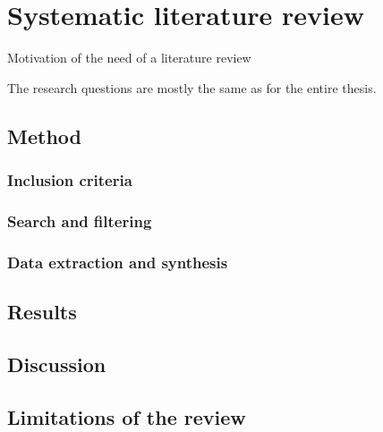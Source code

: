 
\chapter{Systematic literature review}
\label{chapter:slr}

Motivation of the need of a literature review

The research questions are mostly the same as for the entire thesis.


\section{Method}


\subsection{Inclusion criteria}

\subsection{Search and filtering}

\subsection{Data extraction and synthesis}


\section{Results}


\section{Discussion}


\section{Limitations of the review}

